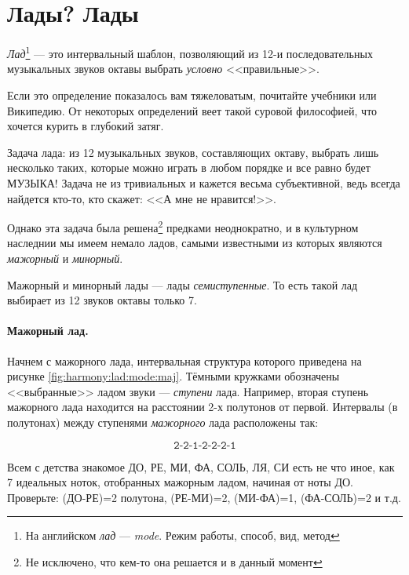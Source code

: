 \section{Лады? Лады}
\label{ch:harmony:lad}

\begin{Definition}[Лад]
    \emph{Лад}\footnote{На английском \emph{лад} --- \emph{mode}. Режим работы, способ, вид, метод} --- это интервальный шаблон, позволяющий из 12-и последовательных музыкальных звуков октавы выбрать \emph{условно} <<правильные>>. 
\end{Definition}

Если это определение показалось вам тяжеловатым, почитайте учебники или Википедию. От некоторых определений веет такой суровой философией, что хочется курить в глубокий затяг.

Задача лада: из 12 музыкальных звуков, составляющих октаву, выбрать лишь несколько таких, которые можно играть в любом порядке и все равно будет МУЗЫКА! Задача не из тривиальных и кажется весьма субъективной, ведь всегда найдется кто-то, кто скажет: <<А мне не нравится!>>. 

Однако эта задача была решена\footnote{Не исключено, что кем-то она решается и в данный момент} предками неоднократно, и в культурном наследнии мы имеем немало ладов, самыми известными из которых являются \emph{мажорный} и \emph{минорный}.

Мажорный и минорный лады --- лады \emph{семиступенные}. То есть такой лад выбирает из 12 звуков октавы только 7.

\paragraph{Мажорный лад.} Начнем с мажорного лада, интервальная структура которого приведена на рисунке \ref{fig:harmony:lad:mode:maj}. Тёмными кружками обозначены <<выбранные>> ладом звуки --- \emph{ступени} лада. Например, вторая ступень мажорного лада находится на расстоянии 2-х полутонов от первой. Интервалы (в полутонах) между ступенями \emph{мажорного} лада расположены так:

\[
    \texttt{2-2-1-2-2-2-1}
\]

Всем с детства знакомое ДО, РЕ, МИ, ФА, СОЛЬ, ЛЯ, СИ есть не что иное, как 7 идеальных ноток, отобранных мажорным ладом, начиная от ноты ДО. Проверьте: (ДО-РЕ)=2 полутона, (РЕ-МИ)=2, (МИ-ФА)=1, (ФА-СОЛЬ)=2 и т.д. 

